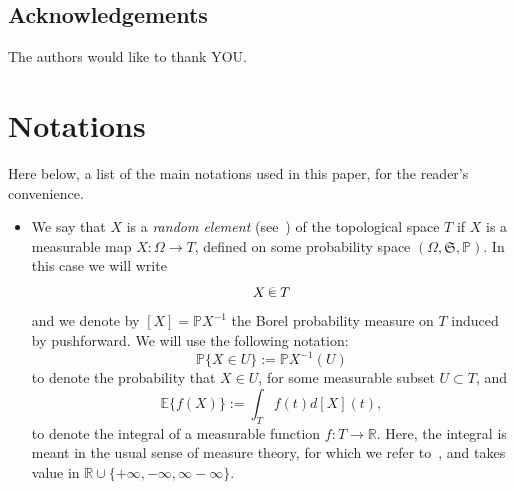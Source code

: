 \documentclass[AHL, Unicode, longabstracts, published]{cedram}
\newcommand{\R}{\mathbb{R}}
\newcommand{\PP}{\mathbb{P}}
\newcommand{\EE}{\mathbb{E}}
\newcommand{\Prob}{(\Omega, \mathfrak{S},\PP)}
\newcommand*\randin{
\mathchoice {\raisebox{-.35ex}{$\displaystyle{^\subset}$}\mkern-11.5mu\raisebox{+.45ex}{$\displaystyle{_\subset}$}} {\mkern+1mu\raisebox{-.27ex}{$\textstyle{^\subset}$}\mkern-11.7mu\raisebox{+.45ex}{$\textstyle{_\subset}$}} {\raisebox{.35ex}{$\scriptstyle\subset$}\mkern-14mu\raisebox{-.15ex}{$\scriptstyle\subset$}} {\raisebox{.3ex}{$\scriptscriptstyle\subset$}\mkern-13.5mu\raisebox{-.10ex}{$\scriptscriptstyle\subset$}}}
\begin{document}
\subsection{Acknowledgements}
The authors would like to thank YOU.



\section{Notations}\label{sec:notations}

Here below, a list of the main notations used in this paper, for the reader's convenience.
\begin{itemize}
\item We say that $X$ is a \emph{random element} (see~\cite{Billingsley}) of the topological space $T$ if $X$ is a measurable map $X\colon \Omega\to T$, defined on some probability space $\Prob$. In this case we will write
\begin{equation*}
X\,\randin\, T
\end{equation*}
and we denote by $[X]=\PP X^{-1}$ the Borel probability measure on $T$ induced by pushforward. We will use the following notation:
\begin{equation*}
\PP\{X\in U\}:=\PP X^{-1}(U)
\end{equation*}
to denote the probability that $X\in U$, for some measurable subset $U\subset T$, and
\begin{equation*}
\EE\{f(X)\}:=\int_{T}f(t)d[X](t),
\end{equation*}
to denote the integral of a measurable function $f\colon T\to \R$. Here, the integral is meant in the usual sense of measure theory, for which we refer to~\cite[section~15]{Bill_prob}, and takes value in $\R\cup\{+\infty,-\infty,\infty-\infty\}$.


\end{itemize}
\end{document}
